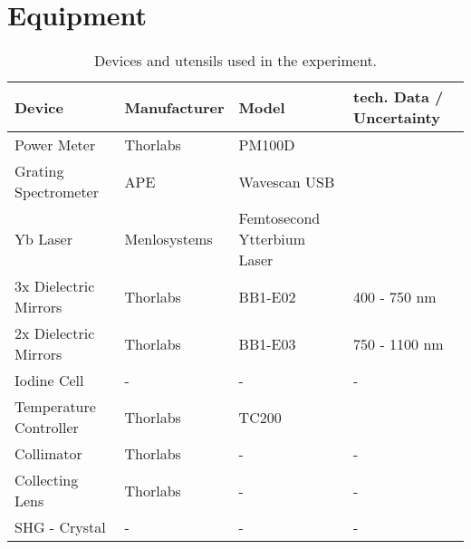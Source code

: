\section{Equipment}
\label{sec:equipment}
\begin{table}[H]
	\centering
	\caption{
		Devices and utensils used in the experiment.
		}
	\begin{tabular}[h]{| l | l | l | l |}
		\hline
		Device     & Manufacturer   & Model  & tech. Data / Uncertainty       \\\hline
		\hline
		Power Meter & Thorlabs & PM100D & \cite{Power} \\ \hline
		Grating Spectrometer & APE & Wavescan USB &  \cite{Speck} \\ \hline
		Yb Laser & Menlosystems & Femtosecond Ytterbium Laser & \cite{Laser} \\ \hline
		3x Dielectric Mirrors & Thorlabs & BB1-E02 & 400 - 750 nm \\ \hline
		2x Dielectric Mirrors & Thorlabs & BB1-E03 & 750 - 1100 nm \\ \hline
		Iodine Cell & - & - & - \\ \hline
 		Temperature Controller & Thorlabs & TC200 & \cite{TempC} \\ \hline
		Collimator &Thorlabs & - &- \\ \hline 
		Collecting Lens & Thorlabs & -& - \\ \hline
		SHG - Crystal & - & - & - \\ \hline
	\end{tabular}
	\label{tab:Geraeteliste}
\end{table}
\newpage